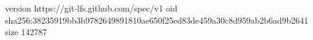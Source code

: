 version https://git-lfs.github.com/spec/v1
oid sha256:38235919bb3b9782649891810ae650f25ed83de459a30c8d959ab2b6ad9b2641
size 142787

